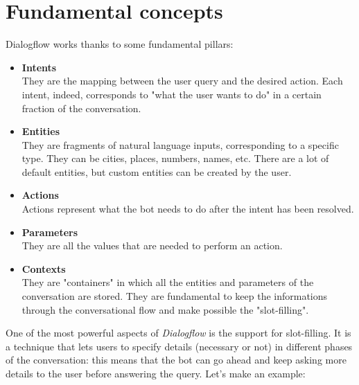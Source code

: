 \documentclass[a4paper,12pt]{report}
\begin{document}
	\section{Fundamental concepts}
		Dialogflow works thanks to some fundamental pillars:
		\begin{itemize}
			\item \textbf{Intents}\\
			They are the mapping between the user query and the desired action. Each intent, indeed, corresponds to "what the user wants to do" in a certain fraction of the conversation.
			\item \textbf{Entities}\\
			They are fragments of natural language inputs, corresponding to a specific type. They can be cities, places, numbers, names, etc. There are a lot of default entities, but custom entities can be created by the user.
			\item \textbf{Actions}\\
			Actions represent what the bot needs to do after the intent has been resolved.
			\item \textbf{Parameters}\\
			They are all the values that are needed to perform an action.
			\item \textbf{Contexts}\\
			They are "containers" in which all the entities and parameters of the conversation are stored. They are fundamental to keep the informations through the conversational flow and make possible the "slot-filling".
		\end{itemize}
	One of the most powerful aspects of \textit{Dialogflow} is the support for slot-filling. It is a technique that lets users to specify details (necessary or not) in different phases of the conversation: this means that the bot can go ahead and keep asking more details to the user before answering the query. Let's make an example:
	
\end{document}
